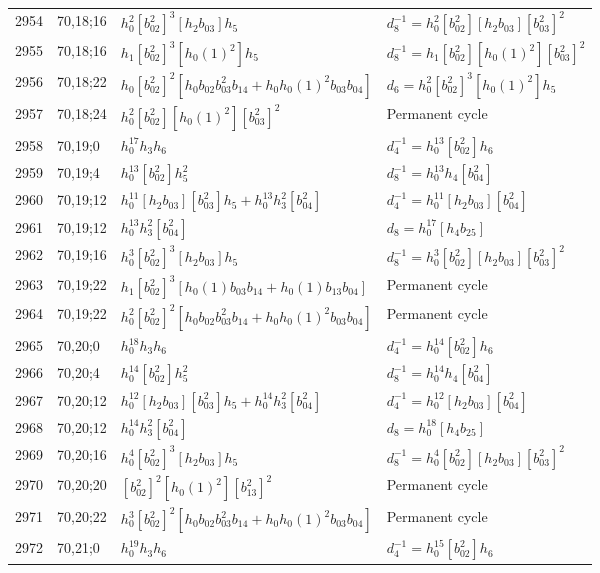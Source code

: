 \documentclass{article}
\begin{document}
\begin{longtable}{|l|l|>{\raggedright\arraybackslash}p{6cm}|>{\raggedright\arraybackslash}p{6cm}|}
\hline
2954 & 70,18;16 & $h_0^2[b_{02}^2]^3[h_2b_{03}]h_5$ & $d_{8}^{-1}=h_0^2[b_{02}^2][h_2b_{03}][b_{03}^2]^2$\\
2955 & 70,18;16 & $h_1[b_{02}^2]^3[h_0(1)^2]h_5$ & $d_{8}^{-1}=h_1[b_{02}^2][h_0(1)^2][b_{03}^2]^2$\\
\hline
2956 & 70,18;22 & $h_0[b_{02}^2]^2[h_0b_{02}b_{03}^2b_{14} + h_0h_0(1)^2b_{03}b_{04}]$ &$d_{6}=h_0^2[b_{02}^2]^3[h_0(1)^2]h_5$\\
\hline
2957 & 70,18;24 & $h_0^2[b_{02}^2][h_0(1)^2][b_{03}^2]^2$ & Permanent cycle\\
\hline
2958 & 70,19;0 & $h_0^{17}h_3h_6$ & $d_{4}^{-1}=h_0^{13}[b_{02}^2]h_6$\\
\hline
2959 & 70,19;4 & $h_0^{13}[b_{02}^2]h_5^2$ & $d_{8}^{-1}=h_0^{13}h_4[b_{04}^2]$\\
\hline
2960 & 70,19;12 & $h_0^{11}[h_2b_{03}][b_{03}^2]h_5 + h_0^{13}h_3^2[b_{04}^2]$ & $d_{4}^{-1}=h_0^{11}[h_2b_{03}][b_{04}^2]$\\
2961 & 70,19;12 & $h_0^{13}h_3^2[b_{04}^2]$ &$d_{8}=h_0^{17}[h_4b_{25}]$\\
\hline
2962 & 70,19;16 & $h_0^3[b_{02}^2]^3[h_2b_{03}]h_5$ & $d_{8}^{-1}=h_0^3[b_{02}^2][h_2b_{03}][b_{03}^2]^2$\\
\hline
2963 & 70,19;22 & $h_1[b_{02}^2]^3[h_0(1)b_{03}b_{14} + h_0(1)b_{13}b_{04}]$ & Permanent cycle\\
2964 & 70,19;22 & $h_0^2[b_{02}^2]^2[h_0b_{02}b_{03}^2b_{14} + h_0h_0(1)^2b_{03}b_{04}]$ & Permanent cycle\\
\hline
2965 & 70,20;0 & $h_0^{18}h_3h_6$ & $d_{4}^{-1}=h_0^{14}[b_{02}^2]h_6$\\
\hline
2966 & 70,20;4 & $h_0^{14}[b_{02}^2]h_5^2$ & $d_{8}^{-1}=h_0^{14}h_4[b_{04}^2]$\\
\hline
2967 & 70,20;12 & $h_0^{12}[h_2b_{03}][b_{03}^2]h_5 + h_0^{14}h_3^2[b_{04}^2]$ & $d_{4}^{-1}=h_0^{12}[h_2b_{03}][b_{04}^2]$\\
2968 & 70,20;12 & $h_0^{14}h_3^2[b_{04}^2]$ &$d_{8}=h_0^{18}[h_4b_{25}]$\\
\hline
2969 & 70,20;16 & $h_0^4[b_{02}^2]^3[h_2b_{03}]h_5$ & $d_{8}^{-1}=h_0^4[b_{02}^2][h_2b_{03}][b_{03}^2]^2$\\
\hline
2970 & 70,20;20 & $[b_{02}^2]^2[h_0(1)^2][b_{13}^2]^2$ & Permanent cycle\\
\hline
2971 & 70,20;22 & $h_0^3[b_{02}^2]^2[h_0b_{02}b_{03}^2b_{14} + h_0h_0(1)^2b_{03}b_{04}]$ & Permanent cycle\\
\hline
2972 & 70,21;0 & $h_0^{19}h_3h_6$ & $d_{4}^{-1}=h_0^{15}[b_{02}^2]h_6$\\

\end{longtable}
\end{document}

